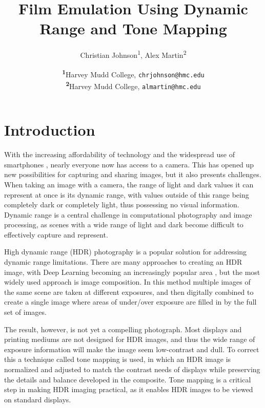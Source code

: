 \documentclass[
	a4paper, %
	10pt, %
	unnumberedsections, %
	twoside, %
]{LTJournalArticle}
\title{Film Emulation Using Dynamic Range and Tone Mapping} %
\author{%
	Christian Johnson\textsuperscript{1}, Alex Martin\textsuperscript{2} 
}
\date{\footnotesize\textsuperscript{\textbf{1}}Harvey Mudd College, \texttt{chrjohnson@hmc.edu} \\ \textsuperscript{\textbf{2}}Harvey Mudd College, \texttt{almartin@hmc.edu}}
\begin{document}
\maketitle %


\section{Introduction}

With the increasing affordability of technology \autocite{intel_moores_law} and the widespread use of smartphones \autocite{pew_mobile_2025}, nearly everyone now has access to a camera. This has opened up new possibilities for capturing and sharing images, but it also presents challenges. When taking an image with a camera, the range of light and dark values it can represent at once is its dynamic range, with values outside of this range being completely dark or completely light, thus possessing no visual information. Dynamic range is a central challenge in computational photography and image processing, as scenes with a wide range of light and dark become difficult to effectively capture and represent. 

High dynamic range (HDR) photography is a popular solution for addressing dynamic range limitations. There are many approaches to creating an HDR image, with Deep Learning becoming an increasingly popular area \autocite{artusi2021}, but the most widely used approach is image composition. In this method multiple images of the same scene are taken at different exposures, and then digitally combined to create a single image where areas of under/over exposure are filled in by the full set of images.

The result, however, is not yet a compelling photograph. Most displays and printing mediums are not designed for HDR images, and thus the wide range of exposure information will make the image seem low-contrast and dull. To correct this a technique called tone mapping is used, in which an HDR image is normalized and adjusted to match the contrast needs of displays while preserving the details and balance developed in the composite. Tone mapping is a critical step in making HDR imaging practical, as it enables HDR images to be viewed on standard displays. 
\end{document}

